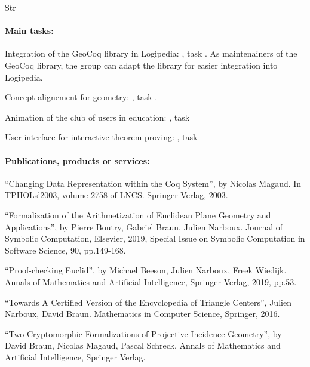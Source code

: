 \begin{sitedescription}{Str}
\paragraph*{Main tasks:}

\begin{compactitem}
\item Integration of the GeoCoq library in Logipedia: , task . As maintenainers of the GeoCoq library, the group can adapt the library for easier integration into Logipedia.
\item Concept alignement for geometry: , task . 
\item Animation of the club of users in education: , task  
\item User interface for interactive theorem proving: , task 
\end{compactitem}

\paragraph*{Publications, products or services:}

\begin{compactitem}
\item ``Changing Data Representation within the Coq System'', by Nicolas Magaud. In TPHOLs'2003, volume 2758 of LNCS. Springer-Verlag, 2003.
\item ``Formalization of the Arithmetization of Euclidean Plane Geometry and Applications'', by Pierre Boutry, Gabriel Braun, Julien Narboux. Journal of Symbolic Computation, Elsevier, 2019, Special Issue on Symbolic Computation in Software Science, 90, pp.149-168.
\item ``Proof-checking Euclid'', by Michael Beeson, Julien Narboux, Freek Wiedijk. Annals of Mathematics and Artificial Intelligence, Springer Verlag, 2019, pp.53.
\item ``Towards A Certified Version of the Encyclopedia of Triangle Centers'', Julien Narboux, David Braun. Mathematics in Computer Science, Springer, 2016.
\item ``Two Cryptomorphic Formalizations of Projective Incidence Geometry'', by David Braun, Nicolas Magaud, Pascal Schreck. Annals of Mathematics and Artificial Intelligence, Springer Verlag.
\end{compactitem}


\end{sitedescription}

